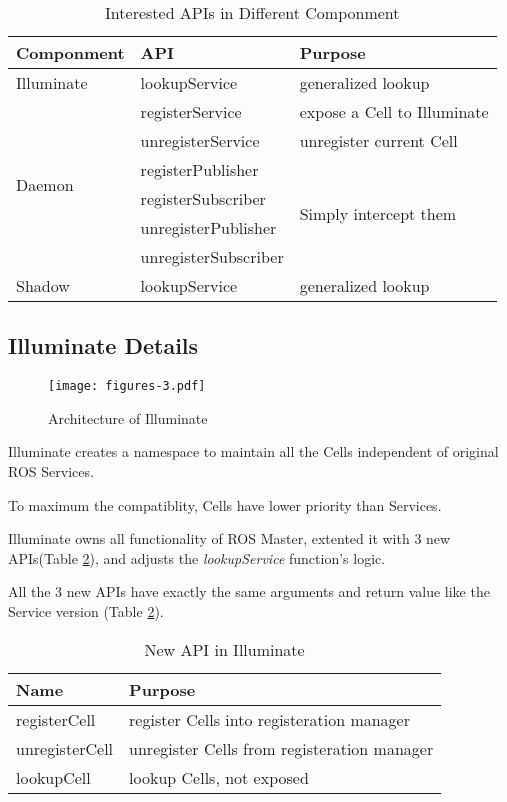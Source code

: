 \begin{table}
    \renewcommand{\arraystretch}{1.3}
    \caption{Interested APIs in Different Componment}
    \label{table:interested-apis}
    \centering
    \begin{tabular}{|l|l|l|}
        \hline
        \bfseries Componment & \bfseries  API & \bfseries Purpose \\
        \hline
        \multirow{1}{*}{Illuminate} & lookupService & generalized lookup \\
        \hline
        \multirow{6}{*}{Daemon} & registerService & expose a Cell to Illuminate\\
        \cline{2-3} & unregisterService & unregister current Cell \\
        \cline{2-3} & registerPublisher & \multirow{4}{*}{Simply intercept them} \\
        \cline{2-2} & registerSubscriber    &  \\
        \cline{2-2} & unregisterPublisher   &  \\
        \cline{2-2} & unregisterSubscriber  &  \\
        \hline
        \multirow{1}{*}{Shadow} & lookupService & generalized lookup \\
        \hline
    \end{tabular}
\end{table} 

\subsection{Illuminate Details}

\begin{figure}[!t]
\centering
\texttt{[image: figures-3.pdf]}
\caption{Architecture of Illuminate}
\label{figure:aoil}
\end{figure}

Illuminate creates a namespace to maintain all the Cells independent of
original ROS Services.

To maximum the compatiblity, Cells have lower priority than Services.

Illuminate owns all functionality of ROS Master,
extented it with 3 new APIs(Table \ref{table:illuminate-api}),
and adjusts the \emph{lookupService} function's logic.

All the 3 new APIs have exactly the same arguments and
return value like the Service version (Table \ref{table:illuminate-api}).

\begin{table}[H]
  \caption{New API in Illuminate}
  \label{table:illuminate-api}
  \centering
  \begin{tabular}{ll}
    \hline
    \bfseries Name & \bfseries Purpose \\
    \hline
    registerCell   & register Cells into registeration manager  \\
    unregisterCell & unregister Cells from registeration manager \\
    lookupCell     & lookup Cells, not exposed \\
    \hline
  \end{tabular}
\end{table} 


